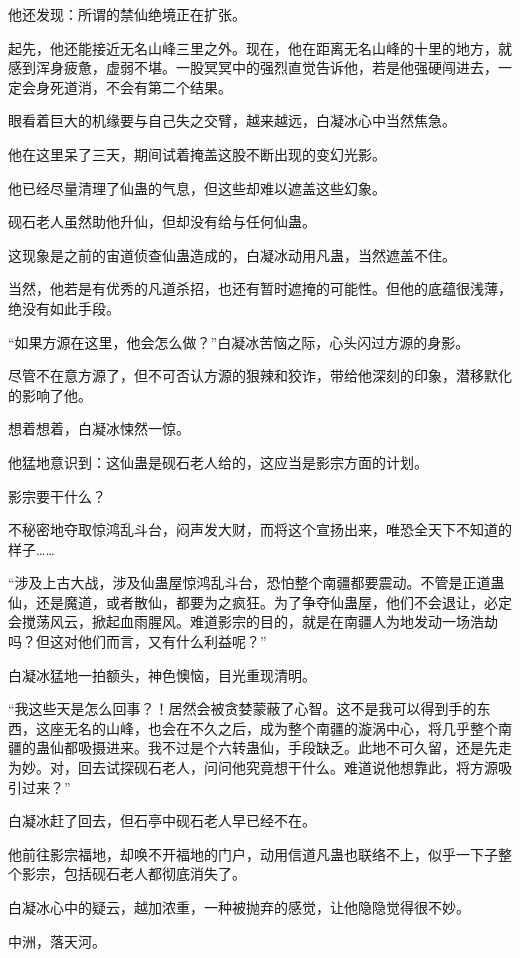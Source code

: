 \begin{this_body}
他还发现：所谓的禁仙绝境正在扩张。

起先，他还能接近无名山峰三里之外。现在，他在距离无名山峰的十里的地方，就感到浑身疲惫，虚弱不堪。一股冥冥中的强烈直觉告诉他，若是他强硬闯进去，一定会身死道消，不会有第二个结果。

眼看着巨大的机缘要与自己失之交臂，越来越远，白凝冰心中当然焦急。

他在这里呆了三天，期间试着掩盖这股不断出现的变幻光影。

他已经尽量清理了仙蛊的气息，但这些却难以遮盖这些幻象。

砚石老人虽然助他升仙，但却没有给与任何仙蛊。

这现象是之前的宙道侦查仙蛊造成的，白凝冰动用凡蛊，当然遮盖不住。

当然，他若是有优秀的凡道杀招，也还有暂时遮掩的可能性。但他的底蕴很浅薄，绝没有如此手段。

“如果方源在这里，他会怎么做？”白凝冰苦恼之际，心头闪过方源的身影。

尽管不在意方源了，但不可否认方源的狠辣和狡诈，带给他深刻的印象，潜移默化的影响了他。

想着想着，白凝冰悚然一惊。

他猛地意识到：这仙蛊是砚石老人给的，这应当是影宗方面的计划。

影宗要干什么？

不秘密地夺取惊鸿乱斗台，闷声发大财，而将这个宣扬出来，唯恐全天下不知道的样子……

“涉及上古大战，涉及仙蛊屋惊鸿乱斗台，恐怕整个南疆都要震动。不管是正道蛊仙，还是魔道，或者散仙，都要为之疯狂。为了争夺仙蛊屋，他们不会退让，必定会搅荡风云，掀起血雨腥风。难道影宗的目的，就是在南疆人为地发动一场浩劫吗？但这对他们而言，又有什么利益呢？”

白凝冰猛地一拍额头，神色懊恼，目光重现清明。

“我这些天是怎么回事？！居然会被贪婪蒙蔽了心智。这不是我可以得到手的东西，这座无名的山峰，也会在不久之后，成为整个南疆的漩涡中心，将几乎整个南疆的蛊仙都吸摄进来。我不过是个六转蛊仙，手段缺乏。此地不可久留，还是先走为妙。对，回去试探砚石老人，问问他究竟想干什么。难道说他想靠此，将方源吸引过来？”

白凝冰赶了回去，但石亭中砚石老人早已经不在。

他前往影宗福地，却唤不开福地的门户，动用信道凡蛊也联络不上，似乎一下子整个影宗，包括砚石老人都彻底消失了。

白凝冰心中的疑云，越加浓重，一种被抛弃的感觉，让他隐隐觉得很不妙。

中洲，落天河。


\end{this_body}
